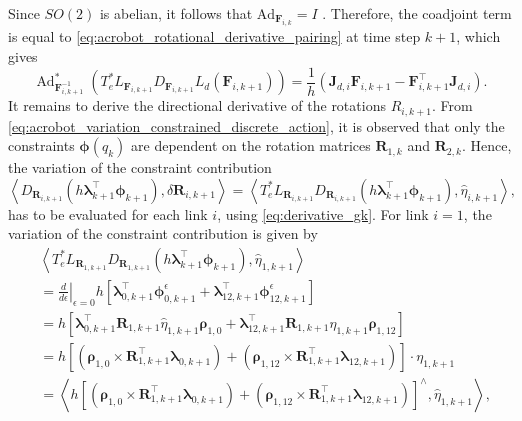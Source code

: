 Since \(SO(2)\) is abelian, it follows that \(\mathrm{Ad}_{\bm{F}_{i,k}}=I\) \cite{Lee2008}.
Therefore, the coadjoint term is equal to \eqref{eq:acrobot_rotational_derivative_pairing} at time step $k+1$, which gives
\begin{equation}\label{eq:acrobot_Ad_variation}
\operatorname{Ad}^{*}_{\bm{F}_{i,k+1}^{-1}}
\!\left(
T_e^*L_{\bm{F}_{i,k+1}}
D_{\bm{F}_{i,k+1}}L_d(\bm{F}_{i,k+1})
\right)
= 
\frac{1}{h}
\left(
\bm{J}_{d,i}\bm{F}_{i,k+1}
-
\bm{F}_{i,k+1}^{\top}\bm{J}_{d,i}
\right).
\end{equation}
It remains to derive the directional derivative of the rotations $R_{i,k+1}$. 
From \eqref{eq:acrobot_variation_constrained_discrete_action}, it is observed that only the constraints $\bm{\phi}(q_k)$ are dependent on
the rotation matrices \(\bm{R}_{1,k}\) and \(\bm{R}_{2,k}\). 
Hence, the variation of the constraint contribution 
\begin{equation*}
    \left\langle D_{\bm{R}_{i,k+1}}(h \bm{\lambda}_{k+1}^\top \bm{\phi}_{k+1}), \delta \bm{R}_{i,k+1} \right\rangle=\left\langle T_e^* L_{\bm{R}_{i,k+1}} D_{\bm{R}_{i,k+1}}(h \bm{\lambda}_{k+1}^\top \bm{\phi}_{k+1}), \hat{\eta}_{i,k+1} \right\rangle,
\end{equation*}
has to be evaluated for each link $i$, using \eqref{eq:derivative_gk}. For link $i=1$, the variation of the constraint contribution is given by
\begin{equation}
    \begin{aligned}
    &
    \left\langle
    T_e^*L_{\bm{R}_{1,k+1}}
    D_{\bm{R}_{1,k+1}}
    \left(
    h\bm{\lambda}_{k+1}^{\top}\bm{\phi}_{k+1}
    \right),
    \hat{\eta}_{1,k+1}
    \right\rangle
    \\
    &=
    \left.
    \frac{d}{d\epsilon}
    \right|_{\epsilon=0}
    h
    \left[
    \bm{\lambda}_{0,k+1}^{\top}
    \bm{\phi}_{0,k+1}^{\epsilon}
    +
    \bm{\lambda}_{12,k+1}^{\top}
    \bm{\phi}_{12,k+1}^{\epsilon}
    \right]
    \\
    &=
    h 
    \left[
    \bm{\lambda}_{0,k+1}^{\top}
    \bm{R}_{1,k+1}\hat{\eta}_{1,k+1}\bm{\rho}_{1,0}
    +
    \bm{\lambda}_{12,k+1}^{\top}
    \bm{R}_{1,k+1}\hat{\eta}_{1,k+1}\bm{\rho}_{1,12}
    \right]
    \\
    &=
    h
    \left[
    \left(
    \bm{\rho}_{1,0}
    \times
    \bm{R}_{1,k+1}^{\top}\bm{\lambda}_{0,k+1}
    \right)
    +
    \left(
    \bm{\rho}_{1,12}
    \times
    \bm{R}_{1,k+1}^{\top}\bm{\lambda}_{12,k+1}
    \right)
    \right]
    \cdot
    \eta_{1,k+1}
    \\
    &=
    \left\langle
    h
    \left[
    \left(
    \bm{\rho}_{1,0}
    \times
    \bm{R}_{1,k+1}^{\top}\bm{\lambda}_{0,k+1}
    \right)
    +
    \left(
    \bm{\rho}_{1,12}
    \times
    \bm{R}_{1,k+1}^{\top}\bm{\lambda}_{12,k+1}
    \right)
    \right]^{\wedge},
    \hat{\eta}_{1,k+1}
    \right\rangle,
    \end{aligned}
    \label{eq:acrobot_R1_constraint_derivative_kp1}
\end{equation}

